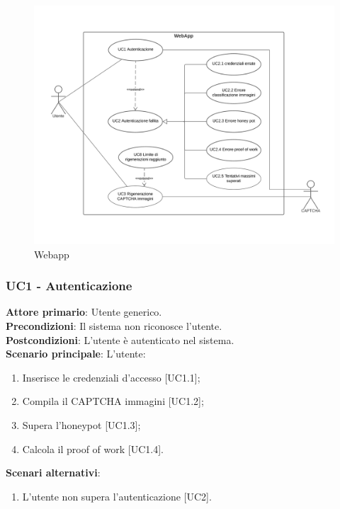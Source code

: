 \begin{figure}[H]
    \centering
    \includegraphics[scale=0.4]{img/web_app.png}
    \caption{Webapp}
\end{figure}

\subsubsection{UC1 - Autenticazione}
\textbf{Attore primario}: Utente generico.\\
\textbf{Precondizioni}: Il sistema non riconosce l'utente.\\
\textbf{Postcondizioni}: L'utente è autenticato nel sistema.\\

\textbf{Scenario principale}: L'utente:
\begin{enumerate}
\item Inserisce le credenziali d'accesso [UC1.1];
\item Compila il CAPTCHA immagini [UC1.2];
\item Supera l'honeypot [UC1.3];
\item Calcola il proof of work [UC1.4].
\end{enumerate}

\textbf{Scenari alternativi}:
\begin{enumerate}
    \item L’utente non supera l'autenticazione [UC2].
\end{enumerate}

